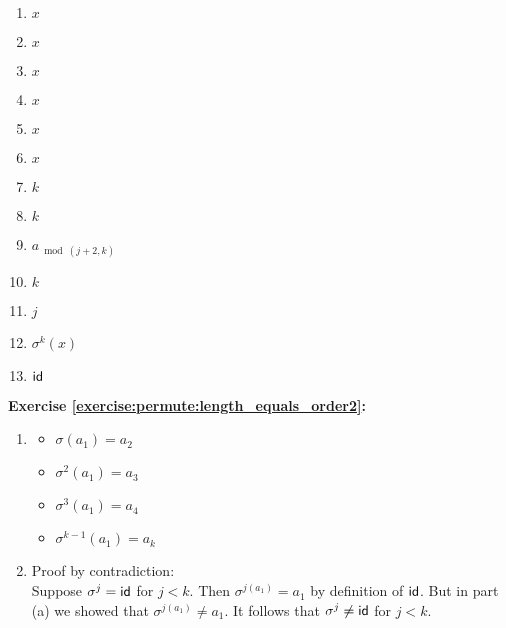 \begin{multicols}{3}
\begin{enumerate}
\item
$x$

\item
$x$

\item
$x$

\item
$x$

\item
$x$

\item
$x$

\item
$k$

\item
$k$

\item
$a_{\bmod{(j+2,k)}}$

\item
$k$

\item
$j$

\item
$\sigma^k(x)$

\item
$\sf{id}$
\end{enumerate}
\end{multicols}

\noindent\textbf{Exercise \ref{exercise:permute:length_equals_order2}:}
\begin{enumerate}[{a.}]
\item
	\begin{multicols}{3}
	\begin{itemize}
	\item
	$\sigma(a_1) = a_2$
	
	\item
	$\sigma^2(a_1) = a_3$
	
	\item
	$\sigma^3(a_1) = a_4$
	
	\item
	$\sigma^{k-1}(a_1) = a_k$
	\end{itemize}
	\end{multicols}
	
\item
Proof by contradiction:
\\
Suppose $\sigma^j = \sf{id}$ for $j < k$. Then $\sigma^{j(a_1)} = a_1$ by definition of $\sf{id}$. But in part (a) we showed that $\sigma^{j(a_1)} \neq a_1$.  It follows that $\sigma^j \neq \sf{id}$ for $j < k$. 
\end{enumerate}

